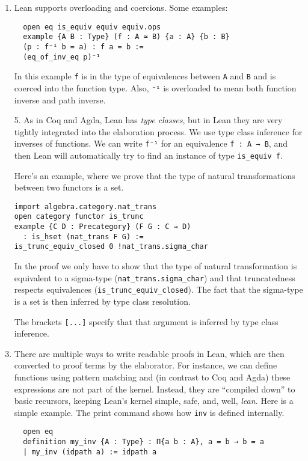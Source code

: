 \documentclass[11pt]{amsart}  %
\begin{document}
\begin{enumerate}
\item 
Lean supports overloading and coercions. Some examples:

\begin{lstlisting}
  open eq is_equiv equiv equiv.ops
  example {A B : Type} (f : A ≃ B) {a : A} {b : B}
  (p : f⁻¹ b = a) : f a = b :=
  (eq_of_inv_eq p)⁻¹
\end{lstlisting}

In this example \lstinline{f} is in the type of equivalences between \lstinline{A} and \lstinline{B} and is coerced into the function type.
Also, \lstinline{⁻¹} is overloaded to mean both function inverse and path inverse.

\item[5.] 
  As in Coq and Agda, Lean has \emph{type classes}, but in Lean they are very tightly integrated into the elaboration process.
  We use type class inference for inverses of functions. We can write \lstinline{f⁻¹} for an equivalence \lstinline{f : A → B},
  and then Lean will automatically try to find an instance of type \lstinline{is_equiv f}.

Here's an example, where we prove that the type of natural transformations between two functors is a set.
\begin{lstlisting}
import algebra.category.nat_trans
open category functor is_trunc
example {C D : Precategory} (F G : C ⇒ D)
  : is_hset (nat_trans F G) :=
is_trunc_equiv_closed 0 !nat_trans.sigma_char
\end{lstlisting}
In the proof we only have to show that the type of natural transformation is equivalent to a sigma-type (\lstinline{nat_trans.sigma_char})
and that truncatedness respects equivalences (\lstinline{is_trunc_equiv_closed}). The fact that the sigma-type is a set is
then inferred by type class resolution.

The brackets \lstinline{[...]} specify that that argument is inferred by type class inference.

\item[6.]
  There are multiple ways to write readable proofs in Lean, which are then converted to proof terms by the elaborator.
  For instance, we can define functions using pattern matching and (in contrast to Coq and Agda) these expressions
  are not part of the kernel. Instead, they are ``compiled down'' to basic recursors, keeping Lean's kernel simple,
  safe, and, well, \emph{lean.} Here is a simple example. The print command shows how \lstinline{inv} is defined internally.

\begin{lstlisting}
  open eq
  definition my_inv {A : Type} : Π{a b : A}, a = b → b = a
  | my_inv (idpath a) := idpath a
 

\end{lstlisting}
\end{enumerate}
\end{document}
